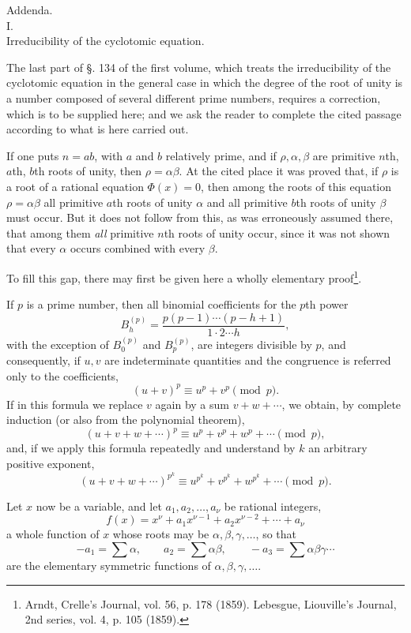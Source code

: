 \documentclass[11pt]{article}
\begin{document}
\begin{center}
{\Large Addenda.}\\[1em]
{\large I.}\\[0.5em]
{\large Irreducibility of the cyclotomic equation.}
\end{center}

The last part of §. 134 of the first volume, which treats the irreducibility of the cyclotomic equation in the general case in which the degree of the root of unity is a number composed of several different prime numbers, requires a correction, which is to be supplied here; and we ask the reader to complete the cited passage according to what is here carried out.

If one puts $n=ab$, with $a$ and $b$ relatively prime, and if $\rho,\alpha,\beta$ are primitive $n$th, $a$th, $b$th roots of unity, then $\rho=\alpha\beta$. At the cited place it was proved that, if $\rho$ is a root of a rational equation $\Phi(x)=0$, then among the roots of this equation $\rho=\alpha\beta$ all primitive $a$th roots of unity $\alpha$ and all primitive $b$th roots of unity $\beta$ must occur. But it does not follow from this, as was erroneously assumed there, that among them \emph{all} primitive $n$th roots of unity occur, since it was not shown that every $\alpha$ occurs combined with every $\beta$.

To fill this gap, there may first be given here a wholly elementary proof\footnote{Arndt, Crelle's Journal, vol. 56, p. 178 (1859). Lebesgue, Liouville's Journal, 2nd series, vol. 4, p. 105 (1859).}.

If $p$ is a prime number, then all binomial coefficients for the $p$th power
\[
B_h^{(p)}=\frac{p(p-1)\cdots(p-h+1)}{1\cdot2\cdots h},
\]
with the exception of $B_0^{(p)}$ and $B_p^{(p)}$, are integers divisible by $p$,
and consequently, if $u,v$ are indeterminate quantities and the congruence is referred only to the coefficients,
\[
(u+v)^p\equiv u^p+v^p \pmod p.
\]
If in this formula we replace $v$ again by a sum $v+w+\cdots$, we obtain, by complete induction (or also from the polynomial theorem),
\[
(u+v+w+\cdots)^p\equiv u^p+v^p+w^p+\cdots \pmod p,
\]
and, if we apply this formula repeatedly and understand by $k$ an arbitrary positive exponent,
\begin{equation}\tag{1}
(u+v+w+\cdots)^{p^k}\equiv u^{p^k}+v^{p^k}+w^{p^k}+\cdots \pmod p.
\end{equation}

Let $x$ now be a variable, and let $a_1,a_2,\ldots,a_\nu$ be rational integers,
\[
f(x)=x^\nu+a_1x^{\nu-1}+a_2x^{\nu-2}+\cdots+a_\nu
\]
a whole function of $x$ whose roots may be $\alpha,\beta,\gamma,\ldots$, so that
\[
-a_1=\sum\alpha,\qquad a_2=\sum\alpha\beta,\qquad -a_3=\sum\alpha\beta\gamma\cdots
\]
are the elementary symmetric functions of $\alpha,\beta,\gamma,\ldots$.
\end{document}
